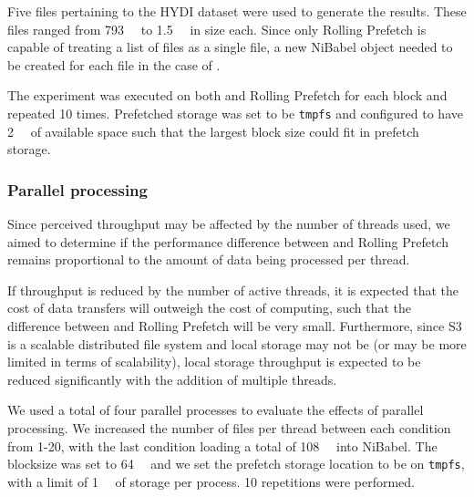 Five files pertaining to the HYDI dataset were used to generate the results.
These files ranged from \SI{793}{\mebi\byte} to \SI{1.5}{\gibi\byte} in size
each. Since only Rolling Prefetch is capable of treating a list of files as a
single file, a new NiBabel object needed to be created for each file in the case
of \sfs.

The experiment was executed on both \sfs and Rolling Prefetch for each block and
repeated 10 times. Prefetched storage was set to be \texttt{tmpfs} and
configured to have \SI{2}{\gibi\byte} of available space such that the largest
block size could fit in prefetch storage.

\subsubsection{Parallel processing}\label{exp:rp:parallel}

Since perceived throughput may be affected by the number of threads used, we
aimed to determine if the performance difference between \sfs and Rolling
Prefetch remains proportional to the amount of data being processed per thread. 

If throughput is reduced by the number of active threads, it is expected that
the cost of data transfers will outweigh the cost of computing, such that the
difference between \sfs and Rolling Prefetch will be very small. Furthermore,
since S3 is a scalable distributed file system and local storage may not be (or
may be more limited in terms of scalability), local storage throughput is
expected to be reduced significantly with the addition of multiple threads. 

We used a total of four parallel processes to evaluate the effects of parallel
processing. We increased the number of files per thread between each condition
from 1-20, with the last condition loading a total of \SI{108}{\gibi\byte} into
NiBabel. The blocksize was set to \SI{64}{\mebi\byte} and we set the prefetch
storage location to be on \texttt{tmpfs}, with a limit of \SI{1}{\gibi\byte} of
storage per process. 10 repetitions were performed.

